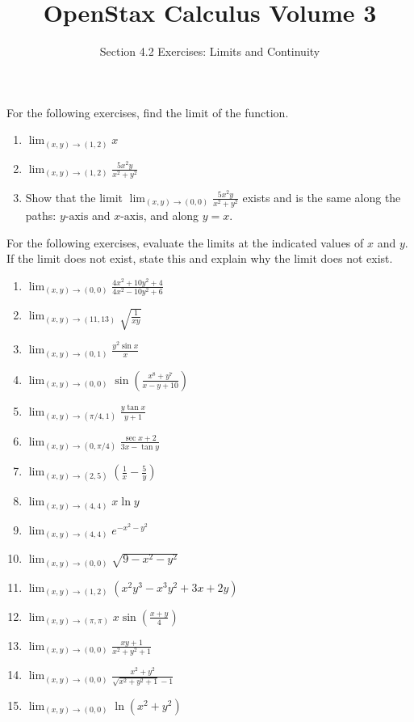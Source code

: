\documentclass{exercises}
\title{OpenStax Calculus Volume 3}
\subtitle{Section 4.2 Exercises: Limits and Continuity}
\author{}
\date{}
\begin{document}
\maketitle


For the following exercises, find the limit of the function.

\begin{enumerate}[start=1]
\item $\lim_{(x,y)\to(1,2)}x$
\item $\lim_{(x,y)\to(1,2)}\frac{5x^{2}y}{x^{2}+y^{2}}$
\item Show that the limit $\lim_{(x,y)\to(0,0)}\frac{5x^{2}y}{x^{2}+y^{2}}$ exists and is the same along the paths: $y\text{-axis}$ and $x\text{-axis}$, and along $y=x$.
\end{enumerate}

For the following exercises, evaluate the limits at the indicated values of $x$ and $y$. If the limit does not exist, state this and explain why the limit does not exist.

\begin{enumerate}[resume]
\item $\lim_{(x,y)\to(0,0)}\frac{4x^{2}+10y^{2}+4}{4x^{2}-10y^{2}+6}$
\item $\lim_{(x,y)\to(11,13)}\sqrt{\frac{1}{xy}}$
\item $\lim_{(x,y)\to(0,1)}\frac{y^{2}\sin x}{x}$
\item $\lim_{(x,y)\to(0,0)}\sin(\frac{x^{8}+y^{7}}{x-y+10})$
\item $\lim_{(x,y)\to(\pi/4,1)}\frac{y\tan x}{y+1}$
\item $\lim_{(x,y)\to(0,\pi/4)}\frac{\sec x+2}{3x-\tan y}$
\item $\lim_{(x,y)\to(2,5)}(\frac{1}{x}-\frac{5}{y})$
\item $\lim_{(x,y)\to(4,4)}x\ln y$
\item $\lim_{(x,y)\to(4,4)}e^{-x^{2}-y^{2}}$
\item $\lim_{(x,y)\to(0,0)}\sqrt{9-x^{2}-y^{2}}$
\item $\lim_{(x,y)\to(1,2)}(x^{2}y^{3}-x^{3}y^{2}+3x+2y)$
\item $\lim_{(x,y)\to(\pi,\pi)}x\sin(\frac{x+y}{4})$
\item $\lim_{(x,y)\to(0,0)}\frac{xy+1}{x^{2}+y^{2}+1}$
\item $\lim_{(x,y)\to(0,0)}\frac{x^{2}+y^{2}}{\sqrt{x^{2}+y^{2}+1}-1}$
\item $\lim_{(x,y)\to(0,0)}\ln(x^{2}+y^{2})$
\end{enumerate}
\end{document}
